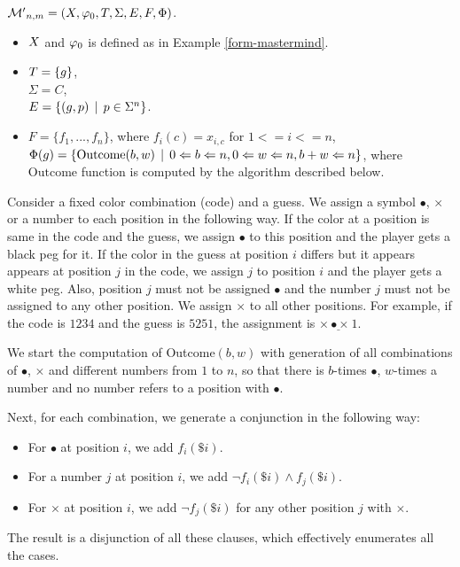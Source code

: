 \begin{example} \label{form-mastermind2}
$\mathcal{M'}_{n,m} = (X, \varphi_0, T, \Sigma, E, F, \Phi)$.

\begin{itemize}
\item
$X$ and $\varphi_0$ is defined as in Example \ref{form-mastermind}. \\

\item
$T = \{ g \}$,\\
$\Sigma = C$, \\
$E = \{(g, p) \:\:|\:\: p\in\Sigma^{n}\}$.\\

\item
$F = \{ f_1, ..., f_n \}$, where $f_i(c) = x_{i,c}$ for $1<=i<=n$,
$\Phi(g) = \{ \textrm{Outcome}(b, w) \:\:|\:\: 0<=b<=n, 0<=w<=n, b+w<=n \}$,
where $\textrm{Outcome}$ function is computed by the algorithm described below.
\end{itemize}

\newcommand{\BlackSymb}{\bullet}
\newcommand{\NoSymb}{\times}

Consider a fixed color combination (code) and a guess.
We assign a symbol $\BlackSymb$, $\NoSymb$ or a number to each position
  in the following way.
If the color at a position is same in the code and the guess, we assign
  $\BlackSymb$ to this position and the player gets a black peg for it.
If the color in the guess at position $i$ differs but it appears
  appears at position $j$ in the code, we assign $j$ to position $i$ and
  the player gets a white peg. Also, position $j$ must not be assigned
  $\BlackSymb$ and the number $j$ must not be assigned to any other position.
We assign $\NoSymb$ to all other positions.
For example, if the code is $1234$ and the guess is $5251$, the assignment is
 $\underline{\NoSymb\BlackSymb\NoSymb\:1}$.

We start the computation of Outcome$(b, w)$ with generation of
  all combinations of $\BlackSymb$, $\NoSymb$ and different numbers from $1$ to
  $n$,
  so that there is $b$-times $\BlackSymb$, $w$-times a number and
  no number refers to a position with $\BlackSymb$.

Next, for each combination, we generate a conjunction in the following way:
\begin{itemize}
\item For $\BlackSymb$ at position $i$, we add $f_i(\$i)$.
\item For a number $j$ at position $i$, we add $\neg f_i(\$i) \wedge f_j(\$i)$.
\item For $\NoSymb$ at position $i$, we add $\neg f_j(\$i)$ for any other position $j$ with $\NoSymb$.
\end{itemize}
The result is a disjunction of all these clauses, which effectively enumerates all the cases.


\end{example}

